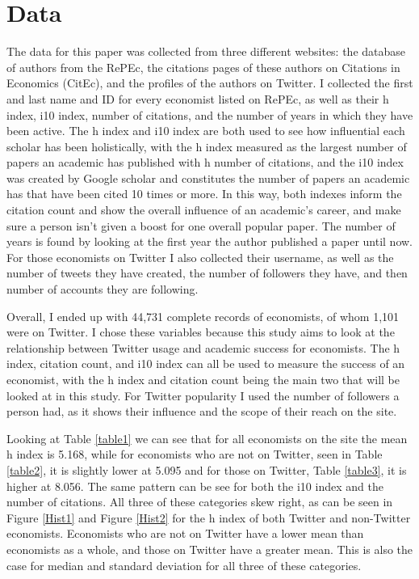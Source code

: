 \documentclass[12pt, Times New Roman]{article}
\begin{document}
\section*{Data}\label{sec:data}

The data for this paper was collected from three different websites: the database of authors from the RePEc, the citations pages of these authors on Citations in Economics (CitEc), and the profiles of the authors on Twitter. I collected the first and last name and ID for every economist listed on RePEc, as well as their h index, i10 index, number of citations, and the number of years in which they have been active. The h index and i10 index are both used to see how influential each scholar has been holistically, with the h index measured as the largest number of papers an academic has published with h number of citations, and the i10 index was created by Google scholar and constitutes the number of papers an academic has that have been cited 10 times or more. In this way, both indexes inform the citation count and show the overall influence of an academic’s career, and make sure a person isn’t given a boost for one overall popular paper. The number of years is found by looking at the first year the author published a paper until now.  For those economists on Twitter I also collected their username, as well as the number of tweets they have created, the number of followers they have, and then number of accounts they are following. 

Overall, I ended up with 44,731 complete records of economists, of whom 1,101 were on Twitter. I chose these variables because this study aims to look at the relationship between Twitter usage and academic success for economists. The h index, citation count, and i10 index can all be used to measure the success of an economist, with the h index and citation count being the main two that will be looked at in this study. For Twitter popularity I used the number of followers a person had, as it shows their influence and the scope of their reach on the site. 

Looking at Table \ref{table1} we can see that for all economists on the site the mean h index is 5.168, while for economists who are not on Twitter, seen in Table \ref{table2}, it is slightly lower at 5.095 and for those on Twitter, Table \ref{table3}, it is higher at 8.056. The same pattern can be see for both the i10 index and the number of citations. All three of these categories skew right, as can be seen in Figure \ref{Hist1} and Figure \ref{Hist2} for the h index of both Twitter and non-Twitter economists. Economists who are not on Twitter have a lower mean than economists as a whole, and those on Twitter have a greater mean. This is also the case for median and standard deviation for all three of these categories. 
\end{document}
